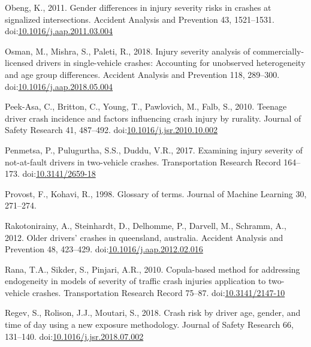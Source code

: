 \documentclass[]{elsarticle} %
\begin{document}
\leavevmode\hypertarget{ref-Obeng2011gender}{}%
Obeng, K., 2011. Gender differences in injury severity risks in crashes
at signalized intersections. Accident Analysis and Prevention 43,
1521--1531.
doi:\href{https://doi.org/10.1016/j.aap.2011.03.004}{10.1016/j.aap.2011.03.004}

\leavevmode\hypertarget{ref-Osman2018injury}{}%
Osman, M., Mishra, S., Paleti, R., 2018. Injury severity analysis of
commercially-licensed drivers in single-vehicle crashes: Accounting for
unobserved heterogeneity and age group differences. Accident Analysis
and Prevention 118, 289--300.
doi:\href{https://doi.org/10.1016/j.aap.2018.05.004}{10.1016/j.aap.2018.05.004}

\leavevmode\hypertarget{ref-Peek-Asa2010teenage}{}%
Peek-Asa, C., Britton, C., Young, T., Pawlovich, M., Falb, S., 2010.
Teenage driver crash incidence and factors influencing crash injury by
rurality. Journal of Safety Research 41, 487--492.
doi:\href{https://doi.org/10.1016/j.jsr.2010.10.002}{10.1016/j.jsr.2010.10.002}

\leavevmode\hypertarget{ref-Penmetsa2017examining}{}%
Penmetsa, P., Pulugurtha, S.S., Duddu, V.R., 2017. Examining injury
severity of not-at-fault drivers in two-vehicle crashes. Transportation
Research Record 164--173.
doi:\href{https://doi.org/10.3141/2659-18}{10.3141/2659-18}

\leavevmode\hypertarget{ref-Provost1998glossary}{}%
Provost, F., Kohavi, R., 1998. Glossary of terms. Journal of Machine
Learning 30, 271--274.

\leavevmode\hypertarget{ref-Rakotonirainy2012older}{}%
Rakotonirainy, A., Steinhardt, D., Delhomme, P., Darvell, M., Schramm,
A., 2012. Older drivers' crashes in queensland, australia. Accident
Analysis and Prevention 48, 423--429.
doi:\href{https://doi.org/10.1016/j.aap.2012.02.016}{10.1016/j.aap.2012.02.016}

\leavevmode\hypertarget{ref-Rana2010copula}{}%
Rana, T.A., Sikder, S., Pinjari, A.R., 2010. Copula-based method for
addressing endogeneity in models of severity of traffic crash injuries
application to two-vehicle crashes. Transportation Research Record
75--87. doi:\href{https://doi.org/10.3141/2147-10}{10.3141/2147-10}

\leavevmode\hypertarget{ref-Regev2018crash}{}%
Regev, S., Rolison, J.J., Moutari, S., 2018. Crash risk by driver age,
gender, and time of day using a new exposure methodology. Journal of
Safety Research 66, 131--140.
doi:\href{https://doi.org/10.1016/j.jsr.2018.07.002}{10.1016/j.jsr.2018.07.002}
\end{document}
